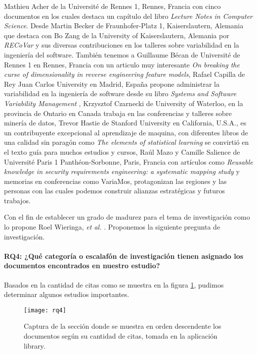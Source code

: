  Mathieu Acher de la Université de Rennes 1, Rennes, Francia con cinco documentos en los cuales destaca un capítulo del libro \textit{Lecture Notes in Computer Science}\cite{Acher2010}. Desde Martin Becker de Fraunhofer-Platz 1, Kaiserslautern, Alemania que destaca con Bo Zang de la University of Kaiserslautern, Alemania por \textit{RECoVar}\cite{Zhang2013}  y sus diversas contribuciones en los talleres sobre variabilidad en la ingeniería del software. También tenemos a Guillaume Bécan de Université de Rennes 1 en Rennes, Francia con un articulo muy interesante \textit{On breaking the curse of dimensionality in reverse engineering feature models}\cite{Davril2015}, Rafael Capilla de Rey Juan Carlos University en Madrid, España propone  administrar la variabilidad en la ingeniería de software desde su libro \textit{Systems and Software Variability Management}\cite{Capilla2013} , Krzysztof Czarnecki de University of Waterloo, en la provincia de Ontario en Canada trabaja en las conferencias y talleres sobre minería de datos, Trevor Hastie de Stanford University en California, U.S.A., es un contribuyente excepcional al aprendizaje de maquina, con diferentes libros de una calidad sin paragón como \textit{The elements of  statistical learning}\cite{Hastie2009} se convirtió en el texto guía para muchos estudios y cursos, Raúl Mazo y Camille Salience  de Université Paris 1 Panthéon-Sorbonne, Paris, Francia con artículos como \textit{Reusable knowledge in security requirements engineering: a systematic mapping study}\cite{Souag2015} y memorias en conferencias como VariaMos\cite{Mazo2015}, protagonizan las regiones y las personas con las cuales podemos construir alianzas estratégicas y futuros trabajos.

Con el fin de establecer un grado de madurez para el tema de investigación como lo propone Roel Wieringa, \textit{et al.} \cite{Wieringa2006}.  Proponemos la siguiente pregunta de investigación.
\paragraph{RQ4: ¿Qué categoría o escalafón de investigación tienen asignado los documentos encontrados en nuestro estudio?}
Basados en la cantidad de citas como se muestra en la figura \ref{rq4}, pudimos determinar algunos estudios importantes. 
\begin{figure}[h]
	\centering
	\texttt{[image: rq4]}
	\caption{Captura de la sección donde se muestra en orden descendente los documentos según su cantidad de citas, tomada en la aplicación library.}
	\label{rq4}
\end{figure}

